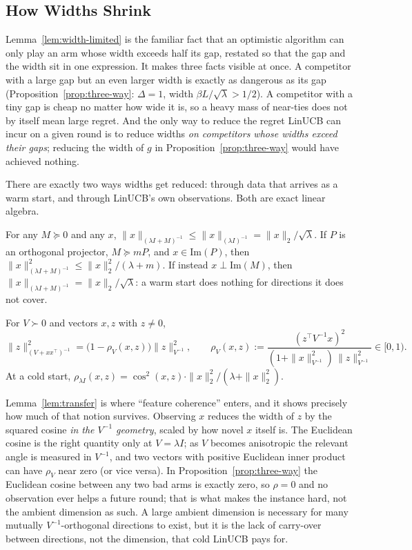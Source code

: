 \documentclass[anon]{alt2027} %
\begin{document}
\subsection{How Widths Shrink}
\label{app:widths}

Lemma~\ref{lem:width-limited} is the familiar fact that an optimistic algorithm can only play an
arm whose width exceeds half its gap, restated so that the gap and the width
sit in one expression. It makes three facts visible at once. A competitor with
a large gap but an even larger width is exactly as dangerous as its gap
(Proposition~\ref{prop:three-way}: $\Delta=1$, width $\beta L/\sqrt\lambda>1/2$).
A competitor with a tiny gap is cheap no matter how wide it is, so a heavy
mass of near-ties does not by itself mean large regret. And the only way to
reduce the regret LinUCB can incur on a given round is to reduce widths
\emph{on competitors whose widths exceed their gaps}; reducing the width of
$g$ in Proposition~\ref{prop:three-way} would have achieved nothing.

There are exactly two ways widths get reduced: through data that arrives as a
warm start, and through LinUCB's own observations. Both are exact linear
algebra.

\begin{lemma}
\label{lem:loewner}
For any $M\succeq0$ and any $x$, $\|x\|_{(\lambda I+M)^{-1}}\le\|x\|_{(\lambda I)^{-1}}=\|x\|_2/\sqrt\lambda$.
If $P$ is an orthogonal projector, $M\succeq mP$, and $x\in\mathrm{Im}(P)$, then
$\|x\|^2_{(\lambda I+M)^{-1}}\le\|x\|_2^2/(\lambda+m)$. If instead $x\perp\mathrm{Im}(M)$,
then $\|x\|_{(\lambda I+M)^{-1}}=\|x\|_2/\sqrt\lambda$: a warm start does nothing
for directions it does not cover.
\end{lemma}

\begin{lemma}
\label{lem:transfer}
For $V\succ0$ and vectors $x,z$ with $z\ne0$,
\[
\|z\|^2_{(V+xx^\top)^{-1}}=\bigl(1-\rho_V(x,z)\bigr)\|z\|^2_{V^{-1}},
\qquad
\rho_V(x,z):=\frac{(z^\top V^{-1}x)^2}{(1+\|x\|^2_{V^{-1}})\,\|z\|^2_{V^{-1}}}\in[0,1).
\]
At a cold start, $\rho_{\lambda I}(x,z)=\cos^2(x,z)\cdot\|x\|_2^2/(\lambda+\|x\|_2^2)$.
\end{lemma}

Lemma~\ref{lem:transfer} is where ``feature coherence'' enters, and it shows
precisely how much of that notion survives. Observing $x$ reduces the width of
$z$ by the squared cosine \emph{in the $V^{-1}$ geometry}, scaled by how novel
$x$ itself is. The Euclidean cosine is the right quantity only at $V=\lambda I$;
as $V$ becomes anisotropic the relevant angle is measured in $V^{-1}$, and two
vectors with positive Euclidean inner product can have $\rho_V$ near zero (or
vice versa). In Proposition~\ref{prop:three-way} the Euclidean cosine between
any two bad arms is exactly zero, so $\rho=0$ and no observation ever helps a
future round; that is what makes the instance hard, not the ambient dimension
as such. A large ambient dimension is necessary for many mutually
$V^{-1}$-orthogonal directions to exist, but it is the lack of carry-over
between directions, not the dimension, that cold LinUCB pays for.
\end{document}
